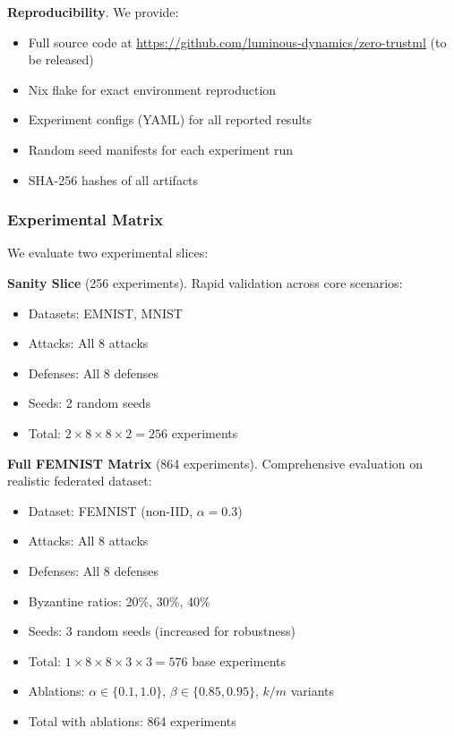 \textbf{Reproducibility}. We provide:
\begin{itemize}[leftmargin=*,noitemsep]
    \item Full source code at \url{https://github.com/luminous-dynamics/zero-trustml} (to be released)
    \item Nix flake for exact environment reproduction
    \item Experiment configs (YAML) for all reported results
    \item Random seed manifests for each experiment run
    \item SHA-256 hashes of all artifacts
\end{itemize}

\subsubsection{Experimental Matrix}

We evaluate two experimental slices:

\textbf{Sanity Slice} (256 experiments). Rapid validation across core scenarios:
\begin{itemize}[leftmargin=*,noitemsep]
    \item Datasets: EMNIST, MNIST
    \item Attacks: All 8 attacks
    \item Defenses: All 8 defenses
    \item Seeds: 2 random seeds
    \item Total: $2 \times 8 \times 8 \times 2 = 256$ experiments
\end{itemize}

\textbf{Full FEMNIST Matrix} (864 experiments). Comprehensive evaluation on realistic federated dataset:
\begin{itemize}[leftmargin=*,noitemsep]
    \item Dataset: FEMNIST (non-IID, $\alpha = 0.3$)
    \item Attacks: All 8 attacks
    \item Defenses: All 8 defenses
    \item Byzantine ratios: 20\%, 30\%, 40\%
    \item Seeds: 3 random seeds (increased for robustness)
    \item Total: $1 \times 8 \times 8 \times 3 \times 3 = 576$ base experiments
    \item Ablations: $\alpha \in \{0.1, 1.0\}$, $\beta \in \{0.85, 0.95\}$, $k/m$ variants
    \item Total with ablations: 864 experiments
\end{itemize}

